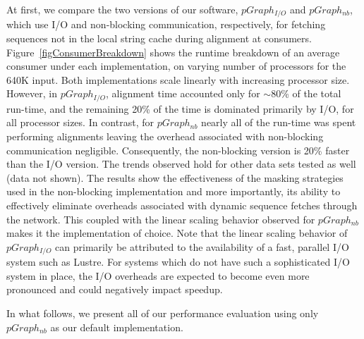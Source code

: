 \documentclass[10pt,journal,letterpaper,compsoc]{IEEEtran}
\begin{document}
At first, we compare the two versions of our software, $pGraph_{I/O}$ and $pGraph_{nb}$, which  use I/O and non-blocking communication, respectively, for fetching sequences not in the local string cache during alignment at consumers. Figure~\ref{figConsumerBreakdown} shows the runtime breakdown of an average consumer under each implementation, on varying number of processors for the 640K input. Both implementations scale linearly with increasing processor size. However, in $pGraph_{I/O}$, alignment time accounted only for $\sim 80$\% of the total run-time, and the remaining 20\% of the time is dominated primarily by I/O, for all processor sizes. In contrast, for $pGraph_{nb}$ nearly all of the run-time was spent performing alignments leaving the overhead associated with non-blocking communication negligible. Consequently, the non-blocking version is 20\% faster than the I/O version. The trends observed hold for other data sets tested as well (data not shown). The results show the effectiveness of the masking strategies used in the non-blocking implementation and more importantly, its ability to effectively eliminate overheads associated with dynamic sequence fetches through the network. This coupled with the linear scaling behavior observed for $pGraph_{nb}$ makes it the implementation of choice. Note that the linear scaling behavior of  $pGraph_{I/O}$ can primarily be attributed to the availability of a fast, parallel I/O system such as Lustre. For systems which do not have such a sophisticated I/O system in place, the I/O overheads are expected to become even more pronounced and could negatively impact speedup. 

In what follows, we present all of our performance evaluation using only $pGraph_{nb}$ as our default implementation.
\end{document}
